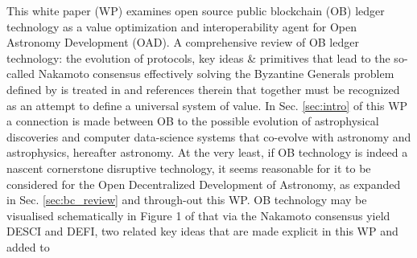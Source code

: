 \documentclass[final,5p,times,twocolumn,authoryear]{elsarticle}
\begin{document}
This white paper (WP) examines open source public blockchain (OB) ledger technology as a value optimization and interoperability agent for Open Astronomy Development (OAD). A comprehensive review of OB ledger technology: the evolution of protocols, key ideas \& primitives that lead to the so-called Nakamoto consensus effectively solving the Byzantine Generals problem defined by \cite{Lamport1982TheBG} is treated in  \cite{arvindandclark2017} and references therein that together must be recognized as an attempt to define a universal system of value. In Sec. \ref{sec:intro} of this WP a connection is made between OB to the possible evolution of astrophysical discoveries and computer data-science systems that co-evolve with astronomy and astrophysics, hereafter astronomy. At the very least, if OB technology is indeed a nascent cornerstone disruptive technology, it seems reasonable for it to be considered for the Open Decentralized Development of Astronomy, as expanded in Sec. \ref{sec:bc_review} and through-out this WP.  OB technology may be visualised schematically in Figure 1 of \cite{arvindandclark2017} that via the Nakamoto consensus yield DESCI and DEFI, two related key ideas that are made explicit in this WP and added to
\end{document}
